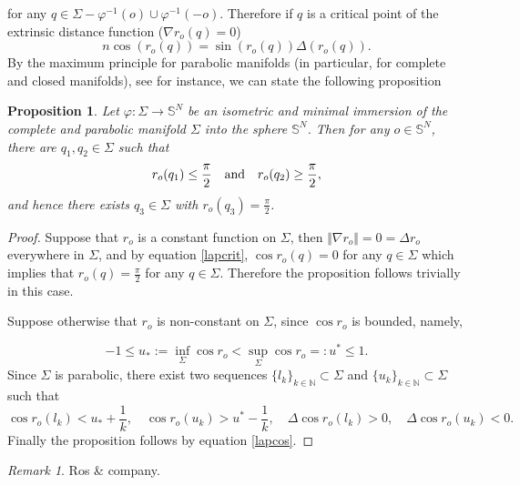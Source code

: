 \documentclass{amsart}
\newtheorem{proposition}[theorem]{Proposition}
\theoremstyle{definition}
\theoremstyle{remark}
\newtheorem{remark}[theorem]{Remark}
\begin{document}
for any $q\in \Sigma-\varphi^{-1}(o)\cup \varphi^{-1}(-o)$.
Therefore if $q$ is a critical point of the extrinsic distance function ($\nabla r_o(q)=0$)
\begin{equation}\label{lapcrit}
  n\cos(r_o(q))=\sin(r_o(q))\Delta (r_o(q)). 
\end{equation}
By the maximum principle for parabolic manifolds (in particular, for complete and closed manifolds), see \cite{Alias2016} for instance, we can state the following proposition
\begin{proposition}\label{prop:max}
Let  $\varphi:\Sigma \to \mathbb{S}^N$ be an isometric and minimal  immersion of the complete and parabolic manifold $\Sigma$ into the sphere $\mathbb{S}^N$. Then for any $o\in \mathbb{S}^N$, there are $q_1, q_2\in \Sigma$ such that
$$
r_o(q_1)\leq \frac{\pi}{2}\quad {\rm and}\quad r_o(q_2)\geq \frac{\pi}{2},
$$
and hence there exists $q_3 \in \Sigma$ with $r_o(q_3)=\frac{\pi}{2}$.
\end{proposition}
\begin{proof}
Suppose that $r_o$ is a constant function on $\Sigma$, then $\Vert \nabla r_o\Vert=0=\Delta r_o$ everywhere in $\Sigma$, and by 
equation \eqref{lapcrit}, $\cos r_o(q)=0$ for any $q\in \Sigma$ which implies that $r_o(q)=\frac{\pi}{2}$ for any $q\in \Sigma$. Therefore the proposition follows trivially in this case. 

Suppose otherwise that $r_o$ is non-constant on $\Sigma$, since $\cos r_o$ is bounded, namely,

$$-1\leq u_*:= \inf_\Sigma \cos r_o<\sup_\Sigma \cos r_o=:u^*\leq 1.$$  
Since $\Sigma$ is parabolic, there exist two sequences $\{l_k\}_{k\in\mathbb{N}}\subset \Sigma$ and  $\{u_k\}_{k\in\mathbb{N}}\subset \Sigma$ such that
$$
\cos r_o(l_k)<u_*+\frac{1}{k},\quad \cos r_o(u_k)>u^*-\frac{1}{k},\quad \Delta \cos r_o(l_k)>0, \quad \Delta \cos r_o(u_k)<0.  
$$
Finally the proposition follows by equation \eqref{lapcos}.
\end{proof}
\begin{remark}
Ros \& company.
\end{remark}
\end{document}
